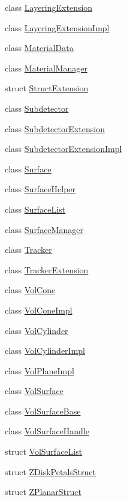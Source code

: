 \begin{DoxyCompactItemize}
class \hyperlink{class_d_d4hep_1_1_d_d_rec_1_1_layering_extension}{Layering\+Extension}
\item 
class \hyperlink{class_d_d4hep_1_1_d_d_rec_1_1_layering_extension_impl}{Layering\+Extension\+Impl}
\item 
class \hyperlink{class_d_d4hep_1_1_d_d_rec_1_1_material_data}{Material\+Data}
\item 
class \hyperlink{class_d_d4hep_1_1_d_d_rec_1_1_material_manager}{Material\+Manager}
\item 
struct \hyperlink{struct_d_d4hep_1_1_d_d_rec_1_1_struct_extension}{Struct\+Extension}
\item 
class \hyperlink{class_d_d4hep_1_1_d_d_rec_1_1_subdetector}{Subdetector}
\item 
class \hyperlink{class_d_d4hep_1_1_d_d_rec_1_1_subdetector_extension}{Subdetector\+Extension}
\item 
class \hyperlink{class_d_d4hep_1_1_d_d_rec_1_1_subdetector_extension_impl}{Subdetector\+Extension\+Impl}
\item 
class \hyperlink{class_d_d4hep_1_1_d_d_rec_1_1_surface}{Surface}
\item 
class \hyperlink{class_d_d4hep_1_1_d_d_rec_1_1_surface_helper}{Surface\+Helper}
\item 
class \hyperlink{class_d_d4hep_1_1_d_d_rec_1_1_surface_list}{Surface\+List}
\item 
class \hyperlink{class_d_d4hep_1_1_d_d_rec_1_1_surface_manager}{Surface\+Manager}
\item 
class \hyperlink{class_d_d4hep_1_1_d_d_rec_1_1_tracker}{Tracker}
\item 
class \hyperlink{class_d_d4hep_1_1_d_d_rec_1_1_tracker_extension}{Tracker\+Extension}
\item 
class \hyperlink{class_d_d4hep_1_1_d_d_rec_1_1_vol_cone}{Vol\+Cone}
\item 
class \hyperlink{class_d_d4hep_1_1_d_d_rec_1_1_vol_cone_impl}{Vol\+Cone\+Impl}
\item 
class \hyperlink{class_d_d4hep_1_1_d_d_rec_1_1_vol_cylinder}{Vol\+Cylinder}
\item 
class \hyperlink{class_d_d4hep_1_1_d_d_rec_1_1_vol_cylinder_impl}{Vol\+Cylinder\+Impl}
\item 
class \hyperlink{class_d_d4hep_1_1_d_d_rec_1_1_vol_plane_impl}{Vol\+Plane\+Impl}
\item 
class \hyperlink{class_d_d4hep_1_1_d_d_rec_1_1_vol_surface}{Vol\+Surface}
\item 
class \hyperlink{class_d_d4hep_1_1_d_d_rec_1_1_vol_surface_base}{Vol\+Surface\+Base}
\item 
class \hyperlink{class_d_d4hep_1_1_d_d_rec_1_1_vol_surface_handle}{Vol\+Surface\+Handle}
\item 
struct \hyperlink{struct_d_d4hep_1_1_d_d_rec_1_1_vol_surface_list}{Vol\+Surface\+List}
\item 
struct \hyperlink{struct_d_d4hep_1_1_d_d_rec_1_1_z_disk_petals_struct}{Z\+Disk\+Petals\+Struct}
\item 
struct \hyperlink{struct_d_d4hep_1_1_d_d_rec_1_1_z_planar_struct}{Z\+Planar\+Struct}
\end{DoxyCompactItemize}
